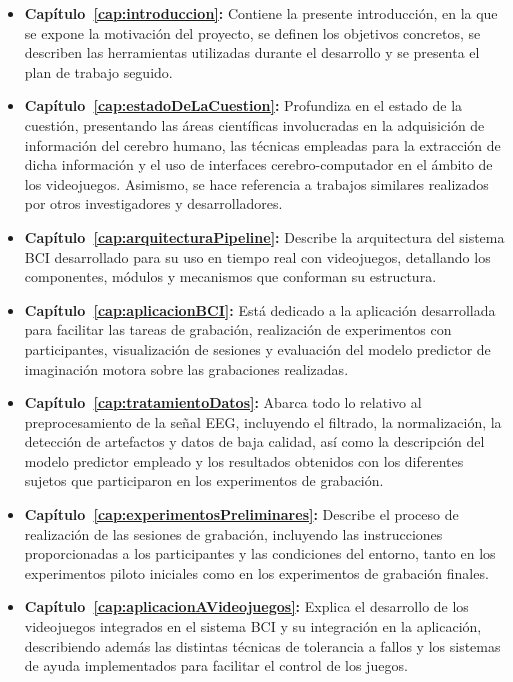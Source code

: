 \begin{itemize}
    \item \textbf{Capítulo~\ref{cap:introduccion}:} Contiene la presente introducción, en la que se 
    expone la motivación del proyecto, se definen los objetivos concretos, se 
    describen las herramientas utilizadas durante el desarrollo y se presenta el 
    plan de trabajo seguido.

    \item \textbf{Capítulo~\ref{cap:estadoDeLaCuestion}:} Profundiza en el estado de la cuestión, 
    presentando las áreas científicas involucradas en la adquisición de 
    información del cerebro humano, las técnicas empleadas para la extracción de 
    dicha información y el uso de interfaces cerebro-computador en el ámbito de 
    los videojuegos. Asimismo, se hace referencia a trabajos similares realizados 
    por otros investigadores y desarrolladores.

    \item \textbf{Capítulo~\ref{cap:arquitecturaPipeline}:} Describe la arquitectura del sistema BCI 
    desarrollado para su uso en tiempo real con videojuegos, detallando los 
    componentes, módulos y mecanismos que conforman su estructura.

    \item \textbf{Capítulo~\ref{cap:aplicacionBCI}:} Está dedicado a la aplicación desarrollada para 
    facilitar las tareas de grabación, realización de experimentos con 
    participantes, visualización de sesiones y evaluación del modelo predictor 
    de imaginación motora sobre las grabaciones realizadas.

    \item \textbf{Capítulo~\ref{cap:tratamientoDatos}:} Abarca todo lo relativo al preprocesamiento de 
    la señal EEG, incluyendo el filtrado, la normalización, la detección de 
    artefactos y datos de baja calidad, así como la descripción del modelo 
    predictor empleado y los resultados obtenidos con los diferentes sujetos 
    que participaron en los experimentos de grabación.

    \item \textbf{Capítulo~\ref{cap:experimentosPreliminares}:} Describe el proceso de realización de las 
    sesiones de grabación, incluyendo las instrucciones proporcionadas a los 
    participantes y las condiciones del entorno, tanto en los experimentos 
    piloto iniciales como en los experimentos de grabación finales.

    \item \textbf{Capítulo~\ref{cap:aplicacionAVideojuegos}:} Explica el desarrollo de los videojuegos 
    integrados en el sistema BCI y su integración en la aplicación, describiendo 
    además las distintas técnicas de tolerancia a fallos y los sistemas de ayuda 
    implementados para facilitar el control de los juegos.


\end{itemize}
